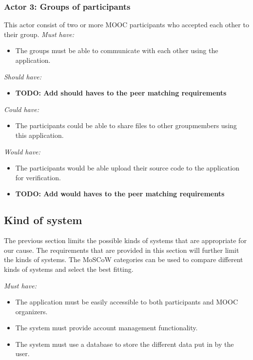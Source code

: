 \documentclass[]{article}
\newcommand{\TODO}[1]{{\color{red}\textbf{TODO: #1}}}
\newcommand{\reqr}[1]{{\noindent\emph{#1:}}}
\begin{document}
\subsubsection{Actor 3: Groups of participants}
This actor consist of two or more MOOC participants who accepted each other to their group.
\reqr{Must have}
\begin{itemize}
\item The groups must be able to communicate with each other using the application.
\end{itemize}

\reqr{Should have}
\begin{itemize}
\item \TODO{Add should haves to the peer matching requirements}
\end{itemize}

\reqr{Could have}
\begin{itemize}
\item The participants could be able to share files to other groupmembers using this application.
\end{itemize}

\reqr{Would have}
\begin{itemize}
\item The participants would be able upload their source code to the application for verification.
\item \TODO{Add would haves to the peer matching requirements}
\end{itemize}

\subsection{Kind of system}
The previous section limits the possible kinds of systems that are appropriate for our cause.
The requirements that are provided in this section will further limit the kinds of systems.
The MoSCoW categories can be used to compare different kinds of systems and select the best fitting.

\reqr{Must have}
\begin{itemize}
\item The application must be easily accessible to both participants and MOOC organizers.
\item The system must provide account management functionality.
\item The system must use a database to store the different data put in by the user.
\end{itemize}
\end{document}
